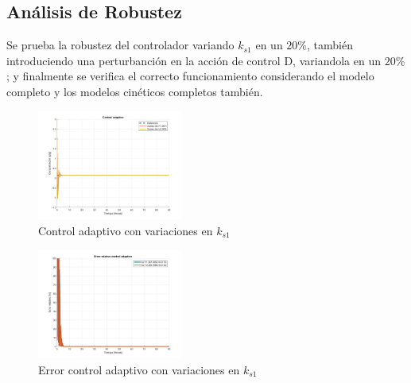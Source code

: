 \documentclass[letterpaper, 10 pt, conference]{ieeeconf}  %
\begin{document}
\subsection{Análisis de Robustez}

Se prueba la robustez del controlador variando $k_{s1}$ en un $20\%$, también introduciendo una perturbanción en la acción de control D, variandola en un $20\%$; y finalmente se verifica el correcto funcionamiento considerando el modelo completo y los modelos cinéticos completos también.

\begin{figure}[H]
  \centering
  \includegraphics[width=0.43\textwidth]{./Images_tp3/ad_ks1.png}
  \caption{Control adaptivo con variaciones en $k_{s1}$}
\end{figure}
\begin{figure}[H]
  \centering
  \includegraphics[width=0.43\textwidth]{./Images_tp3/ad_err_ks1.png}
  \caption{Error control adaptivo con variaciones en $k_{s1}$}
\end{figure}
\end{document}
